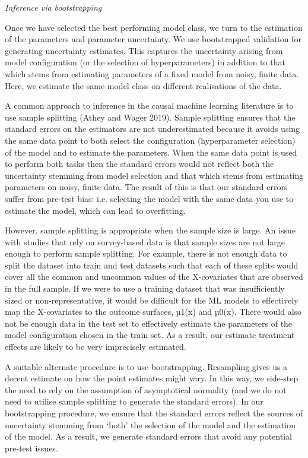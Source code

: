 \documentclass[12pt, a4paper]{article}
\begin{document}
\emph{Inference via bootstrapping}


Once we have selected the best performing model class, we turn to the estimation of the parameters and parameter uncertainty. We use bootstrapped validation for generating uncertainty estimates. This captures the uncertainty arising from model configuration (or the selection of hyperparameters) in addition to that which stems from estimating parameters of a fixed model from noisy, finite data. Here, we estimate the same model class on different realisations of the data. 

A common approach to inference in the causal machine learning literature is to use sample splitting (Athey and Wager 2019). Sample splitting ensures that the standard errors on the estimators are not underestimated because it avoids using the same data point to both select the configuration (hyperparameter selection) of the model and to estimate the parameters. When the same data point is used to perform both tasks then the standard errors would not reflect both the uncertainty stemming from model selection and that which stems from estimating parameters on noisy, finite data. The result of this is that our standard errors suffer from pre-test bias: i.e. selecting the model with the same data you use to estimate the model, which can lead to overfitting.

However, sample splitting is appropriate when the sample size is large. An issue with studies that rely on survey-based data is that sample sizes are not large enough to perform sample splitting. For example, there is not enough data to split the dataset into train and test datasets such that each of these splits would cover all the common and uncommon values of the X-covariates that are observed in the full sample. If we were to use a training dataset that was insufficiently sized or non-representative, it would be difficult for the ML models to effectively map the X-covariates to the outcome surfaces, µ1(x) and µ0(x). There would also not be enough data in the test set to effectively estimate the parameters of the model configuration chosen in the train set. As a result, our estimate treatment effects are likely to be very imprecisely estimated. 

A suitable alternate procedure is to use bootstrapping. Resampling gives us a decent estimate on how the point estimates might vary. In this way, we side-step the need to rely on the assumption of asymptotical normality (and we do not need to utilise sample splitting to generate the standard errors). In our bootstrapping procedure, we ensure that the standard errors reflect the sources of uncertainty stemming from ‘both’ the selection of the model and the estimation of the model. As a result, we generate standard errors that avoid any potential pre-test issues.
\end{document}
